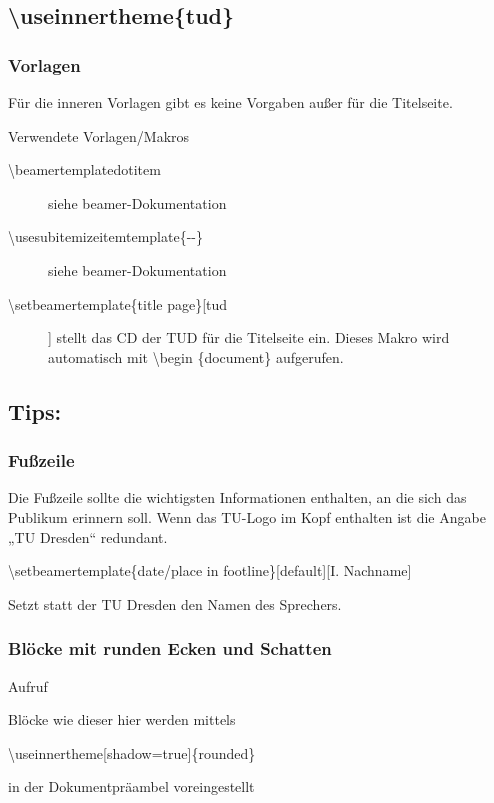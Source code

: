 \documentclass[presentation,t]{beamer}
\begin{document}
\subsection{\textbackslash useinnertheme\{tud\}}
\label{sec-2-5}
\begin{frame}[allowframebreaks]
\frametitle{Vorlagen}
\label{sec-2-5-1}

Für die inneren Vorlagen gibt es keine Vorgaben außer für die
Titelseite.
\begin{block}{Verwendete Vorlagen/Makros}
\label{sec-2-5-1-1}

\begin{description}
\item[\textbackslash beamertemplatedotitem] siehe beamer-Dokumentation
\item[\textbackslash usesubitemizeitemtemplate\{-\/-\}] siehe
     beamer-Dokumentation
\item[\textbackslash setbeamertemplate\{title page\}[tud]] stellt das CD
     der TUD für die Titelseite ein. Dieses Makro wird automatisch mit
     \textbackslash begin \{document\} aufgerufen.
\end{description}
\end{block}
\end{frame}
\subsection{Tips:}
\label{sec-2-6}
\begin{frame}
\frametitle{Fußzeile}
\label{sec-2-6-1}

Die Fußzeile sollte die wichtigsten Informationen enthalten, an die
sich das Publikum erinnern soll. Wenn das TU-Logo im Kopf enthalten
ist die Angabe „TU Dresden“ redundant.

\textbackslash setbeamertemplate\{date/place in
footline\}[default][I. Nachname] 

Setzt statt der TU Dresden den Namen
des Sprechers.
\end{frame}
\begin{frame}
\frametitle{Blöcke mit runden Ecken und Schatten}
\label{sec-2-6-2}
\begin{block}{Aufruf}
\label{sec-2-6-2-1}

Blöcke wie dieser hier werden mittels 

\textbackslash useinnertheme[shadow=true]\{rounded\}

in der Dokumentpräambel voreingestellt
\end{block}
\end{frame}
\end{document}
